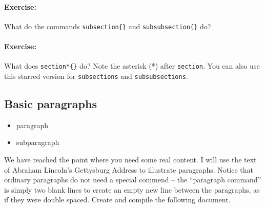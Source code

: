         \paragraph{Exercise:}What do the commands \texttt{subsection\{\}} and \texttt{subsubsection\{\}} do?

        \paragraph{Exercise:}What does \texttt{section*\{\}} do? Note the asterisk (*) after \texttt{section}. You can also use this starred version for \texttt{subsections} and \texttt{subsubsections}.

        \subsection{Basic paragraphs}
        \label{Basic-paragraphs}
        
        \begin{framed}
            \begin{itemize}
                \item{paragraph}
                \item{subparagraph}
            \end{itemize}
        \end{framed}


        We have reached the point where you need some real content. I will use the text of Abraham Lincoln's Gettysburg Address to illustrate paragraphs. Notice that ordinary paragraphs do not need a special commend -- the ``paragraph command'' is simply two blank lines to create an empty new line between the paragraphs, as if they were double spaced. Create and compile the following document.

